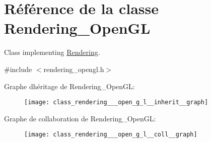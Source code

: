 \hypertarget{class_rendering___open_g_l}{}\section{Référence de la classe Rendering\+\_\+\+Open\+GL}
\label{class_rendering___open_g_l}


Class implementing \hyperlink{class_rendering}{Rendering}.  




{\ttfamily \#include $<$rendering\+\_\+opengl.\+h$>$}



Graphe d\textquotesingle{}héritage de Rendering\+\_\+\+Open\+GL\+:
\nopagebreak
\begin{figure}[H]
\begin{center}
\leavevmode
\texttt{[image: class\_rendering\_\_\_open\_g\_l\_\_inherit\_\_graph]}
\end{center}
\end{figure}


Graphe de collaboration de Rendering\+\_\+\+Open\+GL\+:
\nopagebreak
\begin{figure}[H]
\begin{center}
\leavevmode
\texttt{[image: class\_rendering\_\_\_open\_g\_l\_\_coll\_\_graph]}
\end{center}
\end{figure}
